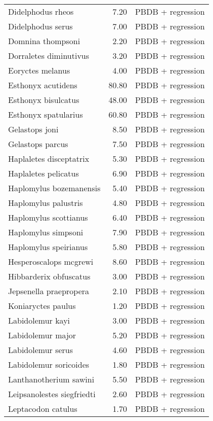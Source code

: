 \begin{table}[ht]
\begin{tabular}{lrl}
  Didelphodus rheos & 7.20 & PBDB + regression \\ 
  Didelphodus serus & 7.00 & PBDB + regression \\ 
  Domnina thompsoni & 2.20 & PBDB + regression \\ 
  Dorraletes diminutivus & 3.20 & PBDB + regression \\ 
  Eoryctes melanus & 4.00 & PBDB + regression \\ 
  Esthonyx acutidens & 80.80 & PBDB + regression \\ 
  Esthonyx bisulcatus & 48.00 & PBDB + regression \\ 
  Esthonyx spatularius & 60.80 & PBDB + regression \\ 
  Gelastops joni & 8.50 & PBDB + regression \\ 
  Gelastops parcus & 7.50 & PBDB + regression \\ 
  Haplaletes disceptatrix & 5.30 & PBDB + regression \\ 
  Haplaletes pelicatus & 6.90 & PBDB + regression \\ 
  Haplomylus bozemanensis & 5.40 & PBDB + regression \\ 
  Haplomylus palustris & 4.80 & PBDB + regression \\ 
  Haplomylus scottianus & 6.40 & PBDB + regression \\ 
  Haplomylus simpsoni & 7.90 & PBDB + regression \\ 
  Haplomylus speirianus & 5.80 & PBDB + regression \\ 
  Hesperoscalops mcgrewi & 8.60 & PBDB + regression \\ 
  Hibbarderix obfuscatus & 3.00 & PBDB + regression \\ 
  Jepsenella praepropera & 2.10 & PBDB + regression \\ 
  Koniaryctes paulus & 1.20 & PBDB + regression \\ 
  Labidolemur kayi & 3.00 & PBDB + regression \\ 
  Labidolemur major & 5.20 & PBDB + regression \\ 
  Labidolemur serus & 4.60 & PBDB + regression \\ 
  Labidolemur soricoides & 1.80 & PBDB + regression \\ 
  Lanthanotherium sawini & 5.50 & PBDB + regression \\ 
  Leipsanolestes siegfriedti & 2.60 & PBDB + regression \\ 
  Leptacodon catulus & 1.70 & PBDB + regression \\ 

\end{tabular}
\end{table}
